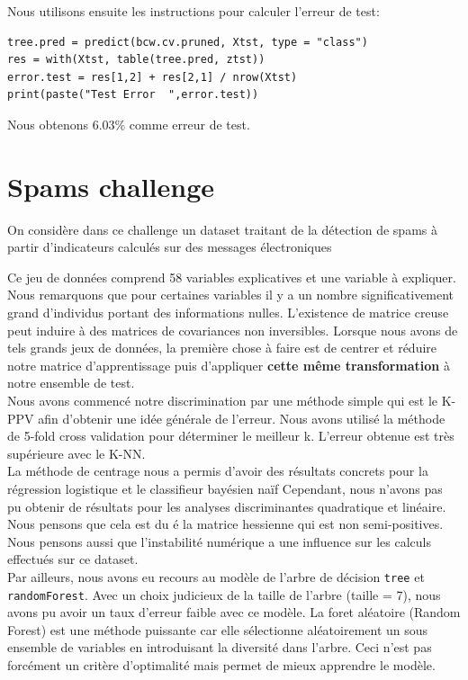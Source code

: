 \documentclass[10pt]{article}
\begin{document}
Nous utilisons ensuite les instructions pour calculer l'erreur de test:
\begin{lstlisting}
tree.pred = predict(bcw.cv.pruned, Xtst, type = "class")
res = with(Xtst, table(tree.pred, ztst))
error.test = res[1,2] + res[2,1] / nrow(Xtst)
print(paste("Test Error  ",error.test))
\end{lstlisting}

Nous obtenons 6.03\% comme erreur de test.

\section{Spams challenge}

On considère dans ce challenge un dataset traitant de la détection de spams à partir d'indicateurs calculés sur des messages électroniques 

Ce jeu de données comprend 58 variables explicatives et une variable à expliquer. Nous remarquons que pour certaines variables il y a un nombre significativement grand d'individus portant des informations nulles. 
L'existence de matrice creuse peut induire à des matrices de covariances non inversibles. 
Lorsque nous avons de tels grands jeux de données, la première chose à faire est de centrer et réduire notre matrice d'apprentissage puis d'appliquer \textbf{cette même transformation} à notre ensemble de test.\\ 

Nous avons commencé notre discrimination par une méthode simple qui est le K-PPV afin d'obtenir une idée générale de l'erreur. Nous avons utilisé la méthode de 5-fold cross validation pour déterminer le meilleur k. L'erreur obtenue est très supérieure avec le K-NN.\\

La méthode de centrage nous a permis d'avoir des résultats concrets pour la régression logistique et le classifieur bayésien naïf Cependant, nous n'avons pas pu obtenir de résultats pour les analyses discriminantes quadratique et linéaire. Nous pensons que cela est du é la matrice hessienne qui est non semi-positives. Nous pensons aussi que l'instabilité numérique a une influence sur les calculs effectués sur ce dataset.\\

Par ailleurs, nous avons eu recours au modèle de l'arbre de décision \texttt{tree} et \texttt{randomForest}. Avec un choix judicieux de la taille de l'arbre (taille = 7), nous avons pu avoir un taux d'erreur faible avec ce modèle. La foret aléatoire (Random Forest) est une méthode puissante car elle sélectionne aléatoirement un sous ensemble de variables en introduisant la diversité dans l'arbre. Ceci n'est pas forcément un critère d'optimalité mais permet de mieux apprendre le modèle.
\end{document}
